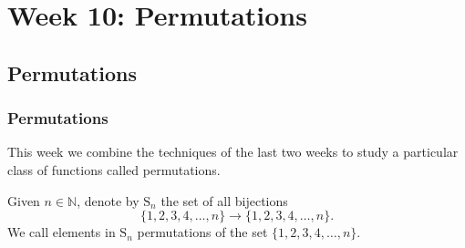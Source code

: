 \documentclass[11pt,dvipsnames]{book}
\numberwithin{equation}{section} %
\numberwithin{figure}{section} %
\numberwithin{table}{section} %
\begin{document}




\pagestyle{empty} %

 \tableofcontents %

\cleardoublepage %

\pagestyle{fancy} %




\part{Week 10: Permutations}




\setcounter{chapter}{6}


\chapter{Permutations}

\setcounter{page}{1}

\section{Permutations}

This week we combine the techniques of the last two weeks to study a particular class of functions called permutations. 

\begin{definition}
Given $n\in\mathbb{N}$, denote by $\mathrm{S}_{n}$ the set of all bijections
$$
\big\{1,2,3,4,\ldots,n\big\}\longrightarrow\big\{1,2,3,4,\ldots,n\big\}.
$$
 We call elements in $\mathrm{S}_{n}$ \textcolor[rgb]{0.98,0.00,0.00}{permutations} of the set $\{1,2,3,4,\ldots,n\}$.
\end{definition}
\end{document}
